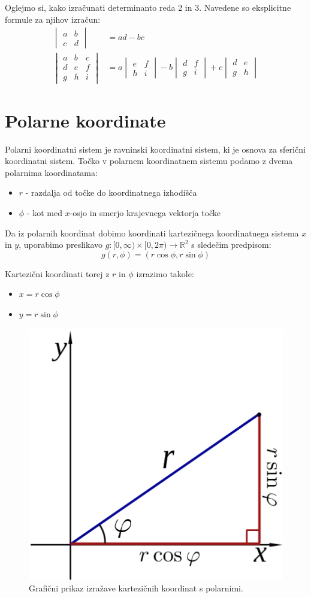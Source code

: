 \documentclass[12pt, a4paper]{article}
\begin{document}
Oglejmo si, kako izračunati determinanto reda 2 in 3. Navedene so eksplicitne formule za njihov izračun:
\begin{align*}
\begin{vmatrix}
a& b  \\
c &d 
\end{vmatrix}
&= ad-bc \\
\begin{vmatrix}
a&b&c\\
d&e&f\\
g&h&i
\end{vmatrix}
&= a
\begin{vmatrix}
e&f\\
h&i
\end{vmatrix}
-b
\begin{vmatrix}
d&f\\
g&i
\end{vmatrix}
+c
\begin{vmatrix}
d&e\\
g&h
\end{vmatrix}
\end{align*}

\section{Polarne koordinate}
Polarni koordinatni sistem je ravninski koordinatni sistem, ki je osnova za sferični koordinatni sistem. Točko v polarnem koordinatnem sistemu podamo z dvema polarnima koordinatama:
\begin{itemize}
\item $r$ - razdalja od točke do koordinatnega izhodišča
\item $\phi$ - kot med $x$-osjo in smerjo krajevnega vektorja točke
\end{itemize}

Da iz polarnih koordinat dobimo koordinati kartezičnega koordinatnega sistema $x$ in $y$, uporabimo preslikavo $g:[ 0,\infty) \times   [0,2\pi)  \rightarrow  \mathbb{R}^2$ s sledečim predpisom:
$$g(r,\phi) = (r \cos \phi, r \sin \phi)$$

Kartezični koordinati torej z $r$ in $\phi$ izrazimo takole:
\begin{itemize}
\item $x=r \cos \phi$
\item $y=r \sin \phi$
\end{itemize}

\begin{figure}[h!]
\centering
\includegraphics[width=.3\textwidth]{polarne_koordinate.png}
\caption{Grafični prikaz izražave kartezičnih koordinat s polarnimi.}
\end{figure}
\end{document}
